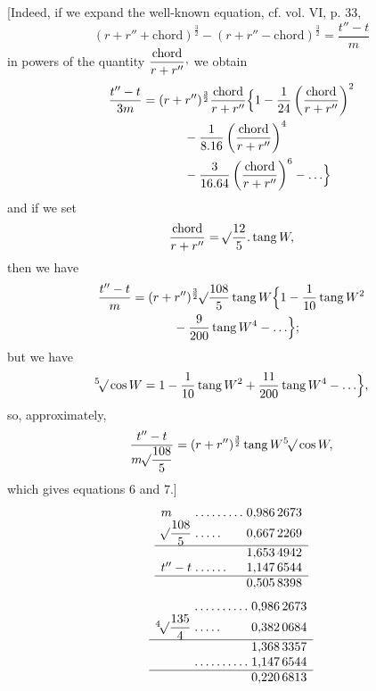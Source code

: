 [Indeed, if we expand the well-known equation, cf. vol. VI, p. 33,
\[
(r+r''+\text{chord})^{\frac{3}{2}}-(r+r''-\text{chord})^{\frac{3}{2}}=\frac{t''-t}{m}
\]
in powers of the quantity \(\dfrac{\text{chord}}{r+r''}\mathpunct{\raisebox{.45ex}{,}}\) we obtain
\[
\begin{aligned}
\frac{t''-t}{3m}={}&(r+r'')^{\frac{3}{2}}\frac{\text{chord}}{r+r''}\Bigl\{1-\frac{1}{24}\left(\frac{\text{chord}}{r+r''}\right)^2\\
&\qquad{}-\frac{1}{8\mathord{.}16}\left(\frac{\text{chord}}{r+r''}\right)^4\\
&\qquad{}-\frac{3}{16\mathord{.}64}\left(\frac{\text{chord}}{r+r''}\right)^6-\mathord{.}\,\mathord{.}\,\mathord{.}\Bigr\}
\end{aligned}
\]
and if we set
\[
\frac{\text{chord}}{r+r''}=\BareRoot{\frac{12}{5}}\mathord{.}\operatorname{tang}W,
\]
then we have
\[
\begin{aligned}
\frac{t''-t}{m}={}&(r+r'')^{\frac{3}{2}}\BareRoot{\frac{108}{5}}\operatorname{tang}W\Bigl\{1-\frac{1}{10}\operatorname{tang}W^2\\
&\qquad{}-\frac{9}{200}\operatorname{tang}W^4-\mathord{.}\,\mathord{.}\,\mathord{.}\Bigr\};
\end{aligned}
\]
but we have
\[
\BareRoot[5]{\cos W}=1-\frac{1}{10}\operatorname{tang}W^2+\frac{11}{200}\operatorname{tang}W^4-\mathord{.}\,\mathord{.}\,\mathord{.}\Bigr\},
\]
so, approximately,
\[
\frac{t''-t}{m\BareRoot{\dfrac{108}{5}}}=(r+r'')^{\frac{3}{2}}\operatorname{tang}W\BareRoot[5]{\cos W},
\]
which gives equations 6 and 7.]
\[
\begin{array}{l@{\;}l@{\;}r}
m&\mathord{.}\,\mathord{.}\,\mathord{.}\,\mathord{.}\,\mathord{.}\,\mathord{.}\,\mathord{.}\,\mathord{.}\,\mathord{.}&0{,}986\,2673\\
\BareRoot{\dfrac{108}{5}}&\mathord{.}\,\mathord{.}\,\mathord{.}\,\mathord{.}\,\mathord{.}&0{,}667\,2269\\[3pt]\hline
&&1{,}653\,4942\\
t''-t&\mathord{.}\,\mathord{.}\,\mathord{.}\,\mathord{.}\,\mathord{.}\,\mathord{.}&1{,}147\,6544\\\hline
&&0{,}505\,8398
\end{array}
\]
\[
\begin{array}{l@{\;}l@{\;}r}
&\mathord{.}\,\mathord{.}\,\mathord{.}\,\mathord{.}\,\mathord{.}\,\mathord{.}\,\mathord{.}\,\mathord{.}\,\mathord{.}\,\mathord{.}&0{,}986\,2673\\
\BareRoot[4]{\dfrac{135}{4}}&\mathord{.}\,\mathord{.}\,\mathord{.}\,\mathord{.}\,\mathord{.}&0{,}382\,0684\\[3pt]\hline
&&1{,}368\,3357\\
&\mathord{.}\,\mathord{.}\,\mathord{.}\,\mathord{.}\,\mathord{.}\,\mathord{.}\,\mathord{.}\,\mathord{.}\,\mathord{.}\,\mathord{.}&1{,}147\,6544\\\hline
&&0{,}220\,6813
\end{array}
\]
